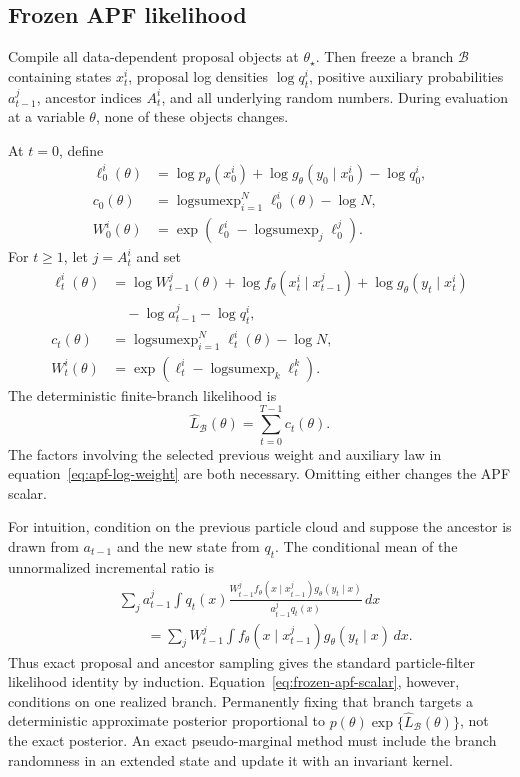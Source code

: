 \documentclass[11pt]{article}
\begin{document}
\subsection{Frozen APF likelihood}

Compile all data-dependent proposal objects at $\theta_\star$. Then freeze a
branch $\mathcal B$ containing states $x_t^i$, proposal log densities
$\log q_t^i$, positive auxiliary probabilities $a_{t-1}^j$, ancestor indices
$A_t^i$, and all underlying random numbers. During evaluation at a variable
$\theta$, none of these objects changes.

At $t=0$, define
\begin{align}
\ell_0^i(\theta)
&=\log p_\theta(x_0^i)
 +\log g_\theta(y_0\mid x_0^i)-\log q_0^i,\\
c_0(\theta)
&=\operatorname{logsumexp}_{i=1}^N\ell_0^i(\theta)-\log N,\\
W_0^i(\theta)
&=\exp\!\left(\ell_0^i-\operatorname{logsumexp}_j\ell_0^j\right).
\end{align}
For $t\geq1$, let $j=A_t^i$ and set
\begin{align}
\ell_t^i(\theta)
&=\log W_{t-1}^{j}(\theta)
 +\log f_\theta(x_t^i\mid x_{t-1}^{j})
 +\log g_\theta(y_t\mid x_t^i)\nonumber\\
&\quad-\log a_{t-1}^{j}-\log q_t^i,\label{eq:apf-log-weight}\\
c_t(\theta)
&=\operatorname{logsumexp}_{i=1}^N\ell_t^i(\theta)-\log N,\\
W_t^i(\theta)
&=\exp\!\left(\ell_t^i-\operatorname{logsumexp}_k\ell_t^k\right).
\end{align}
The deterministic finite-branch likelihood is
\begin{equation}\label{eq:frozen-apf-scalar}
\widehat L_{\mathcal B}(\theta)=\sum_{t=0}^{T-1}c_t(\theta).
\end{equation}
The factors involving the selected previous weight and auxiliary law in
equation~\eqref{eq:apf-log-weight} are both necessary. Omitting either changes
the APF scalar.

For intuition, condition on the previous particle cloud and suppose the
ancestor is drawn from $a_{t-1}$ and the new state from $q_t$. The conditional
mean of the unnormalized incremental ratio is
\begin{align}
&\sum_j a_{t-1}^j\int q_t(x)
\frac{W_{t-1}^j f_\theta(x\mid x_{t-1}^j)g_\theta(y_t\mid x)}
{a_{t-1}^j q_t(x)}\,dx\nonumber\\
&\qquad=\sum_jW_{t-1}^j
\int f_\theta(x\mid x_{t-1}^j)g_\theta(y_t\mid x)\,dx.
\label{eq:apf-conditional-mean}
\end{align}
Thus exact proposal and ancestor sampling gives the standard particle-filter
likelihood identity by induction. Equation~\eqref{eq:frozen-apf-scalar},
however, conditions on one realized branch. Permanently fixing that branch
targets a deterministic approximate posterior proportional to
$p(\theta)\exp\{\widehat L_{\mathcal B}(\theta)\}$, not the exact posterior.
An exact pseudo-marginal method must include the branch randomness in an
extended state and update it with an invariant kernel.
\end{document}
